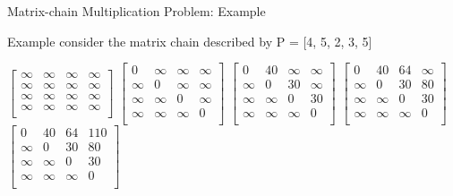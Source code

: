 \begin{frame}{Matrix-chain Multiplication Problem: Example}
  \begin{exampleblock}{Example}
    consider the matrix chain described by P = [4, 5, 2, 3, 5]
  \end{exampleblock}

  \vspace{0.5em}

  $
    \begin{bmatrix}
      \infty & \infty & \infty & \infty \\
      \infty & \infty & \infty & \infty \\
      \infty & \infty & \infty & \infty \\
      \infty & \infty & \infty & \infty \\
    \end{bmatrix}
  $
  \pause
  $
    \begin{bmatrix}
      0 & \infty & \infty & \infty \\
      \infty & 0 & \infty & \infty \\
      \infty & \infty & 0 & \infty \\
      \infty & \infty & \infty & 0 \\
    \end{bmatrix}
  $
  \pause
   $
    \begin{bmatrix}
      0 & 40 & \infty & \infty \\
      \infty & 0 & 30  & \infty \\
      \infty & \infty & 0 & 30 \\
      \infty & \infty & \infty & 0 \\
    \end{bmatrix}
  $
  \pause
  $
    \begin{bmatrix}
      0 & 40 & 64 & \infty \\
      \infty & 0 & 30  & 80 \\
      \infty & \infty & 0 & 30 \\
      \infty & \infty & \infty & 0 \\
    \end{bmatrix}
  $
  \pause
   $
    \begin{bmatrix}
      0 & 40 & 64 & 110 \\
      \infty & 0 & 30  & 80 \\
      \infty & \infty & 0 & 30 \\
      \infty & \infty & \infty & 0 \\
    \end{bmatrix}
  $
\end{frame}


